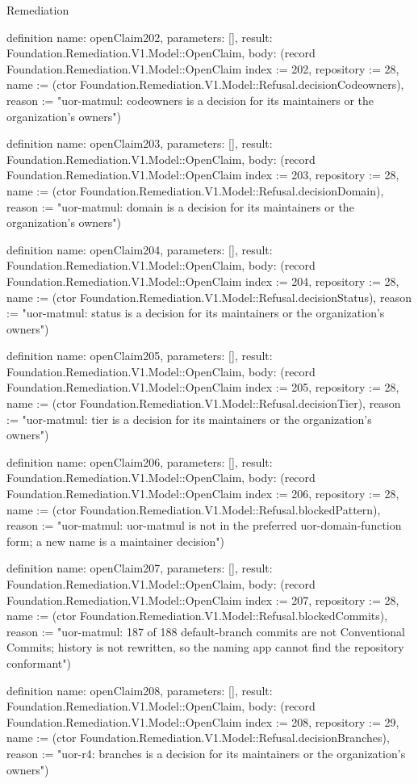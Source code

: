 \begin{lexlean}{Remediation}
\begin{semanticmodule}
definition{
  name: openClaim202,
  parameters: [],
  result: Foundation.Remediation.V1.Model::OpenClaim,
  body: (record Foundation.Remediation.V1.Model::OpenClaim {index := 202, repository := 28, name := (ctor Foundation.Remediation.V1.Model::Refusal.decisionCodeowners), reason := "uor-matmul: codeowners is a decision for its maintainers or the organization's owners"})
}

definition{
  name: openClaim203,
  parameters: [],
  result: Foundation.Remediation.V1.Model::OpenClaim,
  body: (record Foundation.Remediation.V1.Model::OpenClaim {index := 203, repository := 28, name := (ctor Foundation.Remediation.V1.Model::Refusal.decisionDomain), reason := "uor-matmul: domain is a decision for its maintainers or the organization's owners"})
}

definition{
  name: openClaim204,
  parameters: [],
  result: Foundation.Remediation.V1.Model::OpenClaim,
  body: (record Foundation.Remediation.V1.Model::OpenClaim {index := 204, repository := 28, name := (ctor Foundation.Remediation.V1.Model::Refusal.decisionStatus), reason := "uor-matmul: status is a decision for its maintainers or the organization's owners"})
}

definition{
  name: openClaim205,
  parameters: [],
  result: Foundation.Remediation.V1.Model::OpenClaim,
  body: (record Foundation.Remediation.V1.Model::OpenClaim {index := 205, repository := 28, name := (ctor Foundation.Remediation.V1.Model::Refusal.decisionTier), reason := "uor-matmul: tier is a decision for its maintainers or the organization's owners"})
}

definition{
  name: openClaim206,
  parameters: [],
  result: Foundation.Remediation.V1.Model::OpenClaim,
  body: (record Foundation.Remediation.V1.Model::OpenClaim {index := 206, repository := 28, name := (ctor Foundation.Remediation.V1.Model::Refusal.blockedPattern), reason := "uor-matmul: uor-matmul is not in the preferred uor-{domain}-{function} form; a new name is a maintainer decision"})
}

definition{
  name: openClaim207,
  parameters: [],
  result: Foundation.Remediation.V1.Model::OpenClaim,
  body: (record Foundation.Remediation.V1.Model::OpenClaim {index := 207, repository := 28, name := (ctor Foundation.Remediation.V1.Model::Refusal.blockedCommits), reason := "uor-matmul: 187 of 188 default-branch commits are not Conventional Commits; history is not rewritten, so the naming app cannot find the repository conformant"})
}

definition{
  name: openClaim208,
  parameters: [],
  result: Foundation.Remediation.V1.Model::OpenClaim,
  body: (record Foundation.Remediation.V1.Model::OpenClaim {index := 208, repository := 29, name := (ctor Foundation.Remediation.V1.Model::Refusal.decisionBranches), reason := "uor-r4: branches is a decision for its maintainers or the organization's owners"})
}


\end{semanticmodule}
\end{lexlean}
